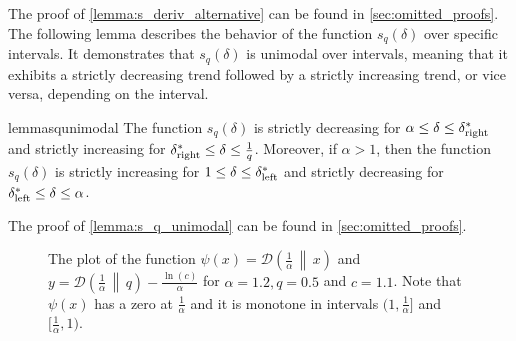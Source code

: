 \documentclass[letterpaper,11pt]{article}
\newcommand{\1}[1]{\mathds{1}\left[#1\right]}
\newcommand{\D}[2]{\mathcal{D}\left(#1\, \middle\|\,#2 \right)}
\newcommand{\sdeltal}{\delta^{*}_{\textnormal{left}}}
\newcommand{\sdeltar}{\delta^{*}_{\textnormal{right}}}
\begin{document}
The proof of \cref{lemma:s_deriv_alternative} can be found in \cref{sec:omitted_proofs}.
The following lemma describes the behavior of the function $s_q(\delta)$ over specific
intervals. It demonstrates that $s_q(\delta)$ is unimodal over intervals, meaning that it exhibits a
strictly decreasing trend followed by a strictly increasing trend, or vice versa,
depending on the interval.

\begin{restatable}{lemma}{squnimodal}
	\label{lemma:s_q_unimodal}
	The function $s_q(\delta)$ is strictly decreasing for $\alpha \leq \delta \leq \sdeltar$
	and strictly increasing for $\sdeltar \leq \delta \leq \frac{1}{q}$.
	Moreover, if $\alpha > 1$, then the function $s_q(\delta)$ is strictly
	increasing for $1 \leq \delta \leq \sdeltal$ and strictly decreasing for
	$\sdeltal \leq \delta \leq \alpha$.
\end{restatable}

The proof of \cref{lemma:s_q_unimodal} can be found in \cref{sec:omitted_proofs}.

	


\begin{figure}[h!]
	\centering
	
 	\caption{The plot of the function $\psi(x) = \D{\frac{1}{\alpha}}{x}$ and $y = \D{\frac{1}{\alpha}}{q} - \frac{\ln(c)}{\alpha}$ for $\alpha = 1.2, q = 0.5$ and $c = 1.1$. Note that $\psi(x)$ has a zero at $\frac{1}{\alpha}$ and it is monotone in intervals $(1,\frac{1}{\alpha}]$ and $[\frac{1}{\alpha},1)$. }
	\label{fig:klplot}
\end{figure}
\end{document}
